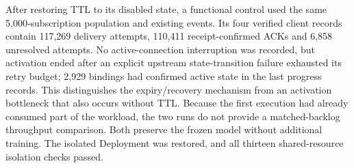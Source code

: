 After restoring TTL to its disabled state, a functional control used the same
5,000-subscription population and existing events. Its four verified client
records contain 117,269 delivery attempts, 110,411 receipt-confirmed ACKs and
6,858 unresolved attempts. No active-connection interruption was recorded,
but activation ended after an explicit upstream state-transition failure
exhausted its retry budget; 2,929 bindings had confirmed active state in the
last progress records. This distinguishes the expiry/recovery mechanism from
an activation bottleneck that also occurs without TTL. Because the first
execution had already consumed part of the workload, the two runs do not
provide a matched-backlog throughput comparison. Both preserve the frozen
model without additional training. The isolated Deployment was restored,
and all thirteen shared-resource isolation checks passed.


